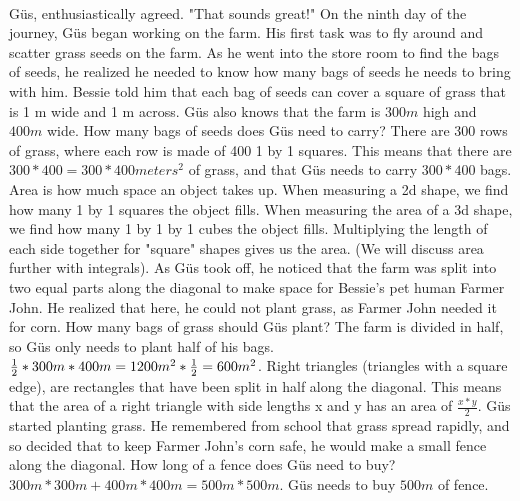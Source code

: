  \paragraph{} G{\"u}s, enthusiastically agreed. "That sounds great!"
 \pagebreak
{On the ninth day of the journey, G{\"u}s began working on the farm. His first task was to fly around and scatter grass seeds on the farm. As he went into the store room to find the bags of seeds, he realized he needed to know how many bags of seeds he needs to bring with him. Bessie told him that each bag of seeds can cover a square of grass that is 1 m wide and 1 m across. G{\"u}s also knows that the farm is $300 m$ high and $400 m$ wide. How many bags of seeds does G{\"u}s need to carry?}
{There are 300 rows of grass, where each row is made of 400 1 by 1 squares. This means that there are $300\ast 400 = 300\ast 400 meters^{2}$ of grass, and that G{\"u}s needs to carry $300\ast 400$ bags.}
{Area is how much space an object takes up. When measuring a 2d shape, we find how many 1 by 1 squares the object fills. When measuring the area of a 3d shape, we find how many 1 by 1 by 1 cubes the object fills. Multiplying the length of each side together for "square" shapes gives us the area. (We will discuss area further with integrals).}
{}
{As G{\"u}s took off, he noticed that the farm was split into two equal parts along the diagonal to make space for Bessie's pet human Farmer John. He realized that here, he could not plant grass, as Farmer John needed it for corn. How many bags of grass should G{\"u}s plant?}
{The farm is divided in half, so G{\"u}s only needs to plant half of his bags. $\frac{1}{2}\ast 300m\ast 400m\linebreak=1200m^{2}\ast\frac{1}{2} \linebreak=600m^{2}$.}
{Right triangles (triangles with a square edge), are rectangles that have been split in half along the diagonal. This means that the area of a right triangle with side lengths x and y has an area of $\frac{x\ast y}{2}$.}
{}
{G{\"u}s started planting grass. He remembered from school that grass spread rapidly, and so decided that to keep Farmer John's corn safe, he would make a small fence along the diagonal. How long of a fence does G{\"u}s need to buy?}
{$300m\ast 300m + 400m\ast 400m = 500m\ast 500m$. G{\"u}s needs to buy $500m$ of fence.}
